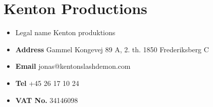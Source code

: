 \chapter{Kenton Productions}
\label{sec:knet}
\begin{itemize}
    \item {Legal name} Kenton produktions
    \item \textbf{Address} Gammel Kongevej 89 A, 2. th. 1850 Frederiksberg C
    \item \textbf{Email} jonas@kentonslashdemon.com
    \item \textbf{Tel} +45 26 17 10 24
    \item \textbf{VAT No.} 34146098
\end{itemize}